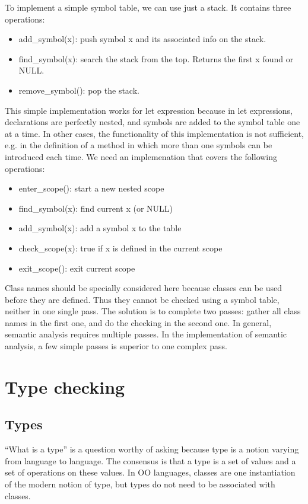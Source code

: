 To implement a simple symbol table, we can use just a stack. It contains three operations:
\begin{itemize}
\item add\_symbol(x): push symbol x and its associated info on the stack. 
\item find\_symbol(x): search the stack from the top. Returns the first x found or NULL.
\item remove\_symbol(): pop the stack.
\end{itemize}
This simple implementation works for {\sf let} expression because in {\sf let} expressions, declarations are perfectly nested, and symbols are added to the symbol table one at a time. In other cases, the functionality of this implementation is not sufficient, e.g. in the definition of a method in which more than one symbols can be introduced each time. We need an implemenation that covers the following operations:
\begin{itemize}
\item enter\_scope(): start a new nested scope
\item find\_symbol(x): find current x (or NULL)
\item add\_symbol(x): add a symbol x to the table
\item check\_scope(x): true if x is defined in the current scope
\item exit\_scope(): exit current scope
\end{itemize}

Class names should be specially considered here because classes can be used before they are defined. Thus they cannot be checked using a symbol table, neither in one single pass. The solution is to complete two passes: gather all class names in the first one, and do the checking in the second one. In general, semantic analysis requires multiple passes. In the implementation of semantic analysis, a few simple passes is superior to one complex pass.
\section{Type checking}
\subsection{Types}
``What is a type'' is a question worthy of asking because type is a notion varying from language to language. The consensus is that a type is a set of values and a set of operations on these values. In OO languages, classes are one instantiation of the modern notion of type, but types do not need to be associated with classes. 

